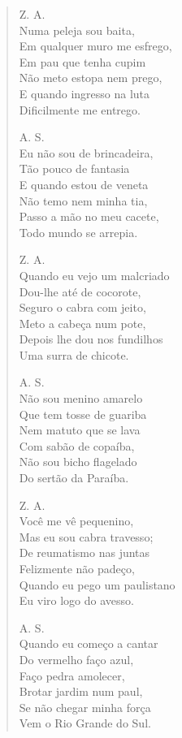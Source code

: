 \begin{verse}
Z. A.\\
Numa peleja sou baita,\\
Em qualquer muro me esfrego,\\
Em pau que tenha cupim\\
Não meto estopa nem prego,\\
E quando ingresso na luta\\
Dificilmente me entrego.

A. S.\\
Eu não sou de brincadeira,\\
Tão pouco de fantasia\\
E quando estou de veneta\\
Não temo nem minha tia,\\
Passo a mão no meu cacete,\\
Todo mundo se arrepia.


Z. A.\\
Quando eu vejo um malcriado\\
Dou-lhe até de cocorote,\\
Seguro o cabra com jeito,\\
Meto a cabeça num pote,\\
Depois lhe dou nos fundilhos\\
Uma surra de chicote.

A. S.\\
Não sou menino amarelo\\
Que tem tosse de guariba\\
Nem matuto que se lava\\
Com sabão de copaíba,\\
Não sou bicho flagelado\\
Do sertão da Paraíba.

Z. A.\\
Você me vê pequenino,\\
Mas eu sou cabra travesso;\\
De reumatismo nas juntas\\
Felizmente não padeço,\\
Quando eu pego um paulistano\\
Eu viro logo do avesso.

A. S.\\
Quando eu começo a cantar\\
Do vermelho faço azul,\\
Faço pedra amolecer,\\
Brotar jardim num paul,\\
Se não chegar minha força\\
Vem o Rio Grande do Sul.



\end{verse}
